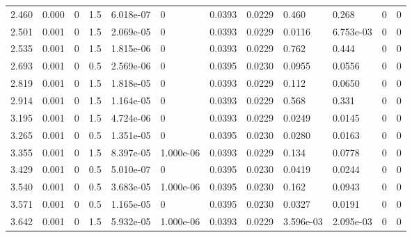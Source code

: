 \documentclass[preview]{standalone}
\begin{document}
{{\begin{tabular}{L{1.2cm}C{1.2cm} C{0.3cm}C{0.5cm} C{1.4cm}C{1.4cm} C{1.4cm}C{1.4cm} C{1.6cm}C{1.6cm} C{1.6cm}C{1.6cm}}
  2.460  &  0.000  & 0     & 1.5 &  6.018e-07  & 0  &  0.0393&   0.0229& 0.460 & 0.268   &  0 & 0  \\ 
  2.501  &  0.001  & 0     & 1.5 &  2.069e-05  & 0  &  0.0393&   0.0229& 0.0116 & 6.753e-03   &  0 & 0  \\ 
  2.535  &  0.001  & 0     & 1.5 &  1.815e-06  & 0  &  0.0393&   0.0229& 0.762 & 0.444   &  0 & 0  \\ 
  2.693  &  0.001  & 0     & 0.5 &  2.569e-06  & 0  &  0.0395&   0.0230& 0.0955 & 0.0556   &  0 & 0  \\ 
  2.819  &  0.001  & 0     & 1.5 &  1.818e-05  & 0  &  0.0393&   0.0229& 0.112 & 0.0650   &  0 & 0  \\ 
  2.914  &  0.001  & 0     & 1.5 &  1.164e-05  & 0  &  0.0393&   0.0229& 0.568 & 0.331   &  0 & 0  \\ 
  3.195  &  0.001  & 0     & 1.5 &  4.724e-06  & 0  &  0.0393&   0.0229& 0.0249 & 0.0145   &  0 & 0  \\ 
  3.265  &  0.001  & 0     & 0.5 &  1.351e-05  & 0  &  0.0395&   0.0230& 0.0280 & 0.0163   &  0 & 0  \\ 
  3.355  &  0.001  & 0     & 1.5 &  8.397e-05  & 1.000e-06  &  0.0393&   0.0229& 0.134 & 0.0778   &  0 & 0  \\ 
  3.429  &  0.001  & 0     & 0.5 &  5.010e-07  & 0  &  0.0395&   0.0230& 0.0419 & 0.0244   &  0 & 0  \\ 
  3.540  &  0.001  & 0     & 0.5 &  3.683e-05  & 1.000e-06  &  0.0395&   0.0230& 0.162 & 0.0943   &  0 & 0  \\ 
  3.571  &  0.001  & 0     & 0.5 &  1.165e-05  & 0  &  0.0395&   0.0230& 0.0327 & 0.0191   &  0 & 0  \\ 
  3.642  &  0.001  & 0     & 1.5 &  5.932e-05  & 1.000e-06  &  0.0393&   0.0229& 3.596e-03 & 2.095e-03   &  0 & 0  \\ 
\hline 
\end{tabular} 

}}
\end{document}
